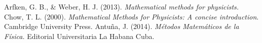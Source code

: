 

\usepackage{fancyhdr}%
\pagestyle{fancy}%
\fancyhead{}
\fancyhead[R]{\footnotesize{\thepage}}
\fancyfoot{}
\usepackage{fourier-orns}

\renewcommand\footrule{%
\hrulefill
\raisebox{-2.1pt}
{\quad\decosix\quad}%
\hrulefill}
\newcommand{\inner}[2]{\langle #1 , #2 \rangle}
\newcommand{\metric}[2]{\rho(#1,#2)}	
\newcommand{\seque}[2]{\{ #1_{#2} \}}
\newcommand{\E}{\mathbf{E}}
\usetikzlibrary{shadows}



\begin{titlepage}






\pagebreak


\begin{thebibliography}{00}
 Arfken, G. B., \& Weber, H. J. (2013). \textit{Mathematical methods for physicists.}
 Chow, T. L. (2000). \textit{Mathematical Methods for Physicists: A concise introduction}. Cambridge University Press.
 Antuña, J. (2014). \textit{Métodos Matemáticos de la Física.} Editorial Universitaria La Habana Cuba.
\end{thebibliography}



\end{titlepage}

